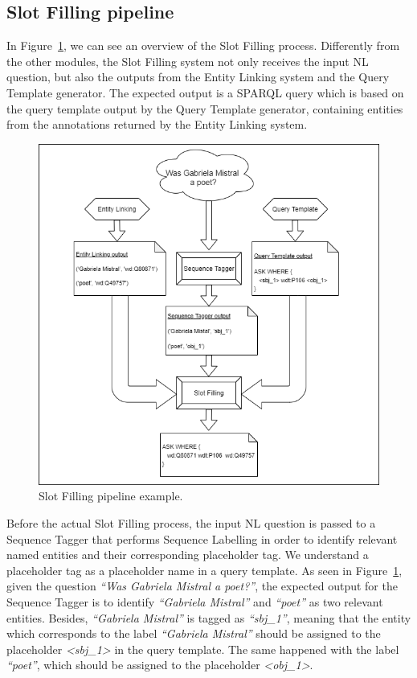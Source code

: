 \subsection{Slot Filling pipeline}
\label{cap3:system/slotFillModule/pipeline}
In Figure~\ref{fig:slotFillingPipeline}, we can see an overview of the Slot Filling process. 
Differently from the other modules, the Slot Filling system not only receives the input NL 
question, but also the outputs from the Entity Linking system and the Query Template generator. 
The expected output is a SPARQL query which is based on the query template output by the 
Query Template generator, containing entities from the annotations returned by the Entity 
Linking system.

\begin{figure}[!h]
    \centering
    \includegraphics[scale=.45]{imagenes/3_system_overview/slotFillingPipeline.png}
    \caption{Slot Filling pipeline example.}
    \label{fig:slotFillingPipeline}
\end{figure}

Before the actual Slot Filling process, the input NL question is passed to a Sequence Tagger 
that performs Sequence Labelling in order to identify relevant named entities and their 
corresponding placeholder tag. We understand a placeholder tag as a placeholder name in a 
query template. As seen in Figure~\ref{fig:slotFillingPipeline}, given the question 
\textit{“Was Gabriela Mistral a poet?”}, the expected output for the Sequence Tagger is to 
identify \textit{“Gabriela Mistral”} and \textit{“poet”} as two relevant entities. Besides, 
\textit{“Gabriela Mistral”} is tagged as \textit{“sbj\_1”}, meaning that the entity which 
corresponds to the label \textit{“Gabriela Mistral”} should be assigned to the placeholder 
\textit{<sbj\_1>} in the query template. The same happened with the label \textit{“poet”}, 
which should be assigned to the placeholder \textit{<obj\_1>}.

